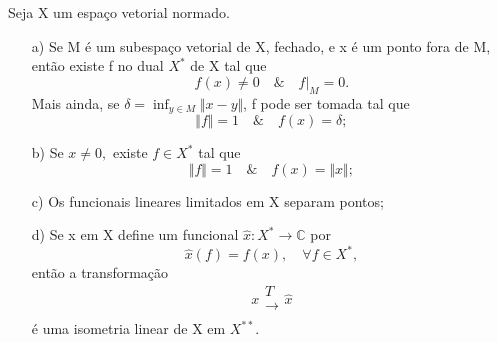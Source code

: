 \documentclass[../functional_analysis.tex]{subfiles}
\begin{document}
  \begin{theorem*}
    Seja X um espaço vetorial normado. 
   \begin{itemize}
     \item[a)] Se M é um subespaço vetorial de X, fechado, e x é um ponto fora de M, então existe f no dual \(X^{*}\) de X tal que 
       \[
         f(x)\neq 0 \quad\&\quad f|_{M}=0.
       \]
       Mais ainda, se \(\delta =\inf_{y\in M}\Vert x-y \Vert\), f pode ser tomada tal que 
         \[
           \Vert f \Vert=1 \quad\&\quad f(x)=\delta ;
         \]
         \item[b)] Se \(x\neq 0,\) existe \(f\in X^{*}\) tal que 
           \[
             \Vert f \Vert=1\quad\&\quad f(x)=\Vert x \Vert;
           \]
        \item[c)] Os funcionais lineares limitados em X separam pontos; 
          \item[d)] Se x em X define um funcional \(\hat{x}:X^{*}\rightarrow \mathbb{C}\) por 
            \[
              \hat{x}(f)=f(x),\quad \forall f\in X^{*},
            \]
            então a transformação 
              \[
                x \substack{T \\ \longrightarrow \\ }\hat{x}
              \]
              é uma isometria linear de X em \(X^{**}.\)
   \end{itemize}
  \end{theorem*}
\end{document}
